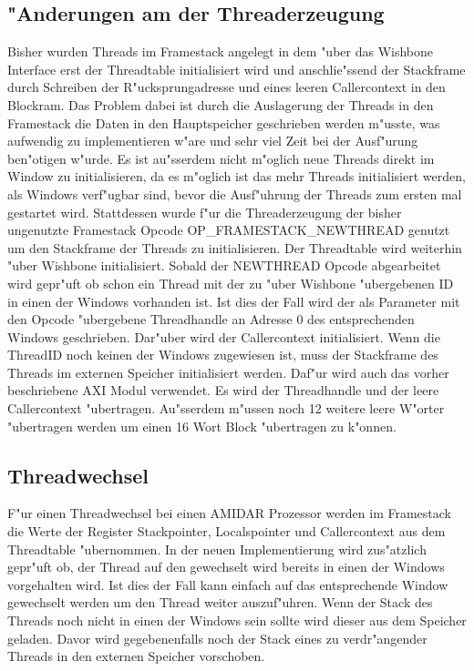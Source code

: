 \subsection{"Anderungen am der Threaderzeugung}
Bisher wurden Threads im Framestack angelegt in dem "uber das Wishbone Interface erst der Threadtable initialisiert wird und anschlie{"ss}end der Stackframe durch Schreiben der R"ucksprungadresse und eines leeren Callercontext in den Blockram. Das Problem dabei ist durch die Auslagerung der Threads in den Framestack die Daten in den Hauptspeicher geschrieben werden m"usste, was aufwendig zu implementieren w"are und sehr viel Zeit bei der Ausf"urung ben"otigen w"urde. Es ist au{"ss}erdem nicht m"oglich neue Threads direkt im Window zu initialisieren, da es m"oglich ist das mehr Threads initialisiert werden, als Windows verf"ugbar sind, bevor die Ausf"uhrung der Threads zum ersten mal gestartet wird. 
Stattdessen wurde f"ur die Threaderzeugung der bisher ungenutzte Framestack Opcode OP\_FRAMESTACK\_NEWTHREAD genutzt um den Stackframe der Threads zu initialisieren. Der Threadtable wird weiterhin "uber Wishbone initialisiert. Sobald der NEWTHREAD Opcode abgearbeitet wird gepr"uft ob schon ein Thread mit der zu "uber Wishbone "ubergebenen ID in einen der Windows vorhanden ist. Ist dies der Fall wird der als Parameter mit den Opcode "ubergebene Threadhandle an Adresse 0 des entsprechenden Windows geschrieben. Dar"uber wird der Callercontext initialisiert. Wenn die ThreadID noch keinen der Windows zugewiesen ist, muss der Stackframe des Threads im externen Speicher initialisiert werden. Daf"ur wird auch das vorher beschriebene AXI Modul verwendet. Es wird der Threadhandle und der leere Callercontext "ubertragen. Au{"ss}erdem m"ussen noch 12 weitere leere W"orter "ubertragen werden um einen 16 Wort Block "ubertragen zu k"onnen. 

\subsection{Threadwechsel}
F"ur einen Threadwechsel bei einen AMIDAR Prozessor werden im Framestack die Werte der Register Stackpointer, Localspointer und Callercontext aus dem Threadtable "ubernommen. In der neuen Implementierung wird zus"atzlich gepr"uft ob, der Thread auf den gewechselt wird bereits in einen der Windows vorgehalten wird. Ist dies der Fall kann einfach auf das entsprechende Window gewechselt werden um den Thread weiter auszuf"uhren. Wenn der Stack des Threads noch nicht in einen der Windows sein sollte wird dieser aus dem Speicher geladen. Davor wird gegebenenfalls noch der Stack eines zu verdr"angender Threads in den externen Speicher vorschoben. 
